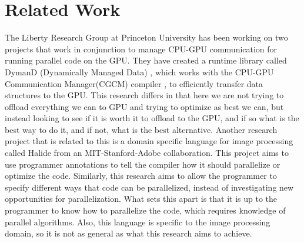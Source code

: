 \documentclass[a4paper,12pt]{article}
\begin{document}
\section{Related Work}
The Liberty Research Group at Princeton University has been working on two projects that work in conjunction to manage CPU-GPU communication for running parallel code on the GPU.  They have created a runtime library called DymanD (Dynamically Managed Data) \cite{dymand}, which works with the CPU-GPU Communication Manager(CGCM) compiler \cite{cgcm}, to efficiently transfer data structures to the GPU.  This research differs in that here we are not trying to offload everything we can to GPU and trying to optimize as best we can, but instead looking to see if it is worth it to offload to the GPU, and if so what is the best way to do it, and if not, what is the best alternative.  Another research project that is related to this is a domain specific language for image processing called Halide from an MIT-Stanford-Adobe collaboration\cite{halide}.  This project aims to use programmer annotations to tell the compiler how it should parallelize or optimize the code.  Similarly, this research aims to allow the programmer to specify different ways that code can be parallelized, instead of investigating new opportunities for parallelization.  What sets this apart is that it is up to the programmer to know how to parallelize the code, which requires knowledge of parallel algorithms.  Also, this language is specific to the image processing domain, so it is not as general as what this research aims to achieve.
\end{document}

